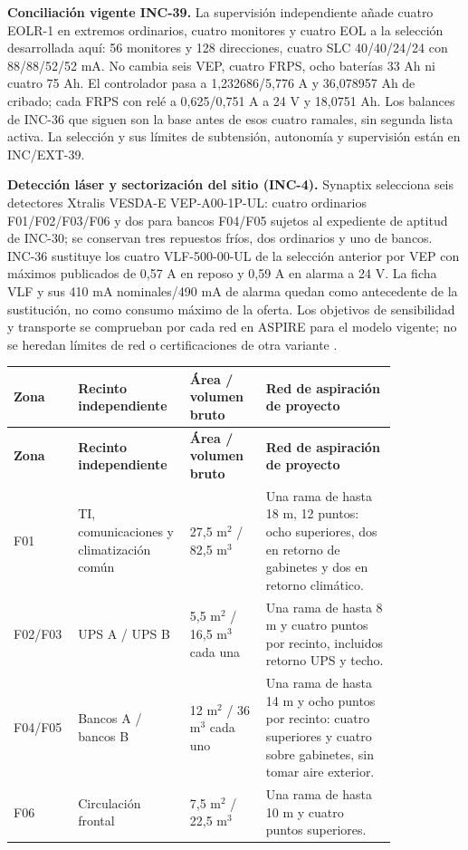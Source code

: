 \textbf{Conciliación vigente INC-39.} La supervisión independiente añade cuatro EOLR-1 en extremos ordinarios, cuatro monitores y cuatro EOL a la selección desarrollada aquí: 56 monitores y 128 direcciones, cuatro SLC 40/40/24/24 con 88/88/52/52 mA. No cambia seis VEP, cuatro FRPS, ocho baterías 33 Ah ni cuatro 75 Ah. El controlador pasa a 1,232686/5,776 A y 36,078957 Ah de cribado; cada FRPS con relé a 0,625/0,751 A a 24 V y 18,0751 Ah. Los balances de INC-36 que siguen son la base antes de esos cuatro ramales, sin segunda lista activa. La selección y sus límites de subtensión, autonomía y supervisión están en INC/EXT-39.

\textbf{Detección láser y sectorización del sitio (INC-4).}\label{sec:sd4-inc4}
Synaptix selecciona seis detectores Xtralis VESDA-E VEP-A00-1P-UL: cuatro ordinarios F01/F02/F03/F06 y dos para bancos F04/F05 sujetos al expediente de aptitud de INC-30; se conservan tres repuestos fríos, dos ordinarios y uno de bancos. INC-36 sustituye los cuatro VLF-500-00-UL de la selección anterior por VEP con máximos publicados de 0,57 A en reposo y 0,59 A en alarma a 24 V. La ficha VLF y sus 410 mA nominales/490 mA de alarma quedan como antecedente de la sustitución, no como consumo máximo de la oferta. Los objetivos de sensibilidad y transporte se comprueban por cada red en ASPIRE para el modelo vigente; no se heredan límites de red o certificaciones de otra variante \parencites[RT-06.16--19, pp.~15--16]{pucv-transversal}[pp.~1--2]{l18-vlf500ul}[p.~2]{lote30-vep36106}.

\begin{longtable}{|p{0.09\linewidth}|p{0.26\linewidth}|p{0.18\linewidth}|p{0.31\linewidth}|}
\hline \textbf{Zona} & \textbf{Recinto independiente} & \textbf{Área / volumen bruto} & \textbf{Red de aspiración de proyecto} \\\hline
\endfirsthead
\hline \textbf{Zona} & \textbf{Recinto independiente} & \textbf{Área / volumen bruto} & \textbf{Red de aspiración de proyecto} \\\hline
\endhead
F01 & TI, comunicaciones y climatización común & 27,5 m$^2$ / 82,5 m$^3$ & Una rama de hasta 18 m, 12 puntos: ocho superiores, dos en retorno de gabinetes y dos en retorno climático. \\\hline
F02/F03 & UPS A / UPS B & 5,5 m$^2$ / 16,5 m$^3$ cada una & Una rama de hasta 8 m y cuatro puntos por recinto, incluidos retorno UPS y techo. \\\hline
F04/F05 & Bancos A / bancos B & 12 m$^2$ / 36 m$^3$ cada uno & Una rama de hasta 14 m y ocho puntos por recinto: cuatro superiores y cuatro sobre gabinetes, sin tomar aire exterior. \\\hline
F06 & Circulación frontal & 7,5 m$^2$ / 22,5 m$^3$ & Una rama de hasta 10 m y cuatro puntos superiores. \\\hline
\end{longtable}

